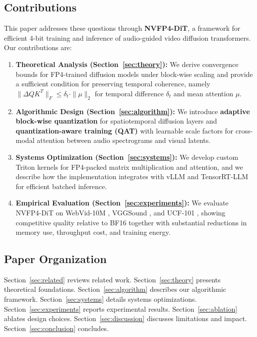 \documentclass[journal,twoside]{IEEEtran}
\theoremstyle{definition}
\theoremstyle{remark}
\begin{document}
\subsection{Contributions}
This paper addresses these questions through \textbf{NVFP4-DiT}, a framework for efficient 4-bit training and inference of audio-guided video diffusion transformers. Our contributions are:

\begin{enumerate}
    \item \textbf{Theoretical Analysis (Section~\ref{sec:theory}):} We derive convergence bounds for FP4-trained diffusion models under block-wise scaling and provide a sufficient condition for preserving temporal coherence, namely $\|\Delta Q K^T\|_F \leq \delta_t \cdot \|\mu\|_2$ for temporal difference $\delta_t$ and mean attention $\mu$.
    
    \item \textbf{Algorithmic Design (Section~\ref{sec:algorithm}):} We introduce \textbf{adaptive block-wise quantization} for spatiotemporal diffusion layers and \textbf{quantization-aware training (QAT)} with learnable scale factors for cross-modal attention between audio spectrograms and visual latents.
    
    \item \textbf{Systems Optimization (Section~\ref{sec:systems}):} We develop custom Triton \cite{tillet2019triton} kernels for FP4-packed matrix multiplication and attention, and we describe how the implementation integrates with vLLM \cite{kwon2023efficient} and TensorRT-LLM \cite{nvidia2024tensorrt} for efficient batched inference.
    
    \item \textbf{Empirical Evaluation (Section~\ref{sec:experiments}):} We evaluate NVFP4-DiT on WebVid-10M \cite{bain2021frozen}, VGGSound \cite{chen2020vggsound}, and UCF-101 \cite{soomro2012ucf101}, showing competitive quality relative to BF16 together with substantial reductions in memory use, throughput cost, and training energy.
\end{enumerate}

\subsection{Paper Organization}
Section~\ref{sec:related} reviews related work. Section~\ref{sec:theory} presents theoretical foundations. Section~\ref{sec:algorithm} describes our algorithmic framework. Section~\ref{sec:systems} details systems optimizations. Section~\ref{sec:experiments} reports experimental results. Section~\ref{sec:ablation} ablates design choices. Section~\ref{sec:discussion} discusses limitations and impact. Section~\ref{sec:conclusion} concludes.
\end{document}
